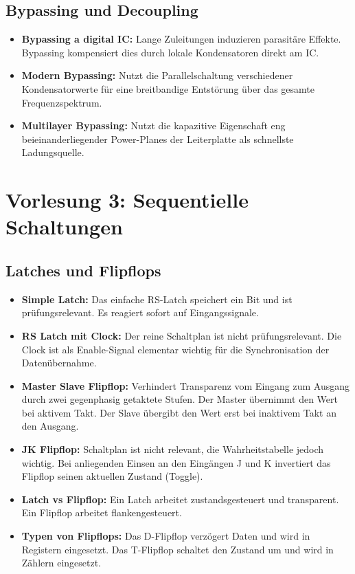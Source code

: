 \documentclass[11pt,a4paper]{article}
\begin{document}
\subsection{Bypassing und Decoupling}
\begin{itemize}
    \item \textbf{Bypassing a digital IC:} Lange Zuleitungen induzieren parasitäre Effekte. Bypassing kompensiert dies durch lokale Kondensatoren direkt am IC.
    \item \textbf{Modern Bypassing:} Nutzt die Parallelschaltung verschiedener Kondensatorwerte für eine breitbandige Entstörung über das gesamte Frequenzspektrum.
    \item \textbf{Multilayer Bypassing:} Nutzt die kapazitive Eigenschaft eng beieinanderliegender Power-Planes der Leiterplatte als schnellste Ladungsquelle.
\end{itemize}

\newpage

\section{Vorlesung 3: Sequentielle Schaltungen}

\subsection{Latches und Flipflops}
\begin{itemize}
    \item \textbf{Simple Latch:} Das einfache RS-Latch speichert ein Bit und ist prüfungsrelevant. Es reagiert sofort auf Eingangssignale.
    \item \textbf{RS Latch mit Clock:} Der reine Schaltplan ist nicht prüfungsrelevant. Die Clock ist als Enable-Signal elementar wichtig für die Synchronisation der Datenübernahme.
    \item \textbf{Master Slave Flipflop:} Verhindert Transparenz vom Eingang zum Ausgang durch zwei gegenphasig getaktete Stufen. Der Master übernimmt den Wert bei aktivem Takt. Der Slave übergibt den Wert erst bei inaktivem Takt an den Ausgang.
    \item \textbf{JK Flipflop:} Schaltplan ist nicht relevant, die Wahrheitstabelle jedoch wichtig. Bei anliegenden Einsen an den Eingängen J und K invertiert das Flipflop seinen aktuellen Zustand (Toggle).
    \item \textbf{Latch vs Flipflop:} Ein Latch arbeitet zustandsgesteuert und transparent. Ein Flipflop arbeitet flankengesteuert.
    \item \textbf{Typen von Flipflops:} Das D-Flipflop verzögert Daten und wird in Registern eingesetzt. Das T-Flipflop schaltet den Zustand um und wird in Zählern eingesetzt.
\end{itemize}
\end{document}
